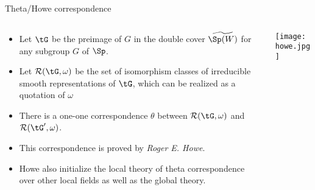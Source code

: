 \documentclass[final,hyperref={pdfpagelabels=false}]{beamer} %
\def\cR{{\mathcal{R}}}
\begin{document}
\begin{frame}
\begin{columns}
\begin{column}{.49\textwidth}
    \begin{block}{Theta/Howe correspondence}
      \begin{columns}
        \begin{column}{0.7\textwidth}
      \begin{itemize}
        \item Let $\tG$ be the preimage of $G$ in the double cover 
          $\widetilde{\Sp(W)}$ for any subgroup $G$ of $\Sp$.
        \item Let $\cR(\tG,\omega)$ be the set of isomorphism classes 
          of irreducible smooth representations of $\tG$,
          which can be realized as a quotation of $\omega$ 
        \item There is a one-one correspondence $\theta$
          between $\cR(\tG,\omega)$ and $\cR(\tG',\omega)$.
        \item This correspondence is proved by {\em Roger E. Howe}.
        \item Howe also initialize the local theory of theta correspondence over other local fields as well as the global theory.
      \end{itemize}
    \end{column}
    \begin{column}{0.26\textwidth}
      \texttt{[image: howe.jpg]}
    \end{column}
  \end{columns}
\end{block}



\end{column}
\end{columns}
\end{frame}
\end{document}
